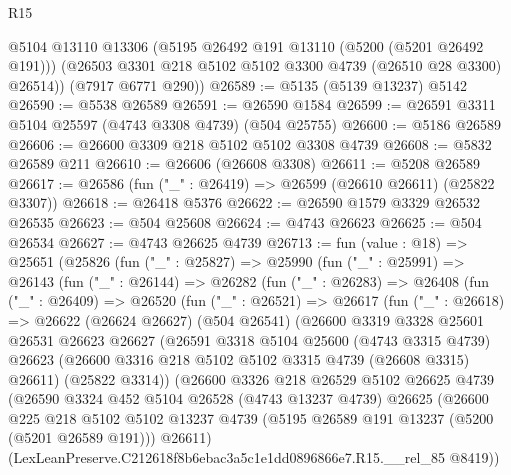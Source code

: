 \begin{lexlean}{R15}
\begin{coremodule}
{{{{{{{{{{{        @5104
        @13110
        @13306
        (@5195 @26492 @191 @13110 (@5200 (@5201 @26492 @191)))
        (@26503 @3301 @218 @5102 @5102 @3300 @4739 (@26510 @28 @3300) @26514))
      (@7917 @6771 @290))
@26589 := @5135 (@5139 @13237) @5142
@26590 := @5538 @26589
@26591 := @26590 @1584
@26599 := @26591 @3311 @5104 @25597 (@4743 @3308 @4739) (@504 @25755)
@26600 := @5186 @26589
@26606 := @26600 @3309 @218 @5102 @5102 @3308 @4739
@26608 := @5832 @26589 @211
@26610 := @26606 (@26608 @3308)
@26611 := @5208 @26589
@26617 := @26586 (fun ("_" : @26419) => @26599 (@26610 @26611) (@25822 @3307))
@26618 := @26418 @5376
@26622 := @26590 @1579 @3329 @26532 @26535
@26623 := @504 @25608
@26624 := @4743 @26623
@26625 := @504 @26534
@26627 := @4743 @26625 @4739
@26713 := fun (value : @18) =>
  @25651
    (@25826
      (fun ("_" : @25827) =>
      @25990
        (fun ("_" : @25991) =>
        @26143
          (fun ("_" : @26144) =>
          @26282
            (fun ("_" : @26283) =>
            @26408
              (fun ("_" : @26409) =>
              @26520
                (fun ("_" : @26521) =>
                @26617
                  (fun ("_" : @26618) =>
                  @26622
                    (@26624 @26627)
                    (@504 @26541)
                    (@26600
                      @3319
                      @3328
                      @25601
                      @26531
                      @26623
                      @26627
                      (@26591
                        @3318
                        @5104
                        @25600
                        (@4743 @3315 @4739)
                        @26623
                        (@26600 @3316 @218 @5102 @5102 @3315 @4739 (@26608 @3315) @26611)
                        (@25822 @3314))
                      (@26600
                        @3326
                        @218
                        @26529
                        @5102
                        @26625
                        @4739
                        (@26590
                          @3324
                          @452
                          @5104
                          @26528
                          (@4743 @13237 @4739)
                          @26625
                          (@26600
                            @225
                            @218
                            @5102
                            @5102
                            @13237
                            @4739
                            (@5195 @26589 @191 @13237 (@5200 (@5201 @26589 @191)))
                            @26611)
                          (LexLeanPreserve.C212618f8b6ebac3a5c1e1dd0896866e7.R15.__rel_85 @8419))
}}}}}}}}}}}
\end{coremodule}
\end{lexlean}
